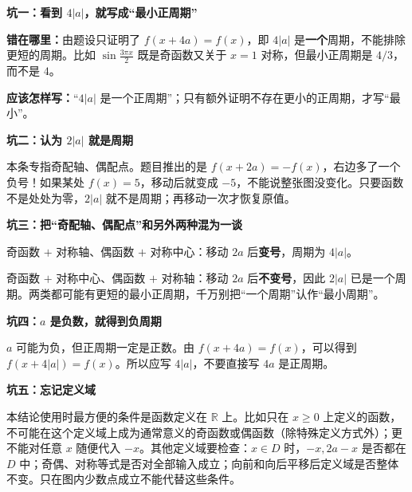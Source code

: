 \clearpage
\begin{trapbox}
\textbf{\textcolor{CTrap}{坑一：看到 $4|a|$，就写成“最小正周期”}}



\textbf{错在哪里：}由题设只证明了 $f(x+4a)=f(x)$，即 $4|a|$ 是\textbf{一个}周期，不能排除更短的周期。比如 $\sin\frac{3\pi x}{2}$ 既是奇函数又关于 $x=1$ 对称，但最小正周期是 $4/3$，而不是 $4$。

\textbf{应该怎样写：}“$4|a|$ 是一个正周期”；只有额外证明不存在更小的正周期，才写“最小”。

\medskip

\end{trapbox}
\clearpage
\begin{trapbox}
\textbf{\textcolor{CTrap}{坑二：认为 $2|a|$ 就是周期}}



本条专指奇配轴、偶配点。题目推出的是 $f(x+2a)=-f(x)$，右边多了一个负号！如果某处 $f(x)=5$，移动后就变成 $-5$，不能说整张图没变化。只要函数不是处处为零，$2|a|$ 就不是周期；再移动一次才恢复原值。

\medskip

\end{trapbox}
\clearpage
\begin{trapbox}
\textbf{\textcolor{CTrap}{坑三：把“奇配轴、偶配点”和另外两种混为一谈}}



奇函数 $+$ 对称轴、偶函数 $+$ 对称中心：移动 $2a$ 后\textbf{变号}，周期为 $4|a|$。

奇函数 $+$ 对称中心、偶函数 $+$ 对称轴：移动 $2a$ 后\textbf{不变号}，因此 $2|a|$ 已是一个周期。两类都可能有更短的最小正周期，千万别把“一个周期”认作“最小周期”。

\medskip

\end{trapbox}
\clearpage
\begin{trapbox}
\textbf{\textcolor{CTrap}{坑四：$a$ 是负数，就得到负周期}}



$a$ 可能为负，但正周期一定是正数。由 $f(x+4a)=f(x)$，可以得到 $f(x+4|a|)=f(x)$。所以应写 $4|a|$，不要直接写 $4a$ 是正周期。

\medskip

\end{trapbox}
\clearpage
\begin{trapbox}
\textbf{\textcolor{CTrap}{坑五：忘记定义域}}



本结论使用时最方便的条件是函数定义在 $\mathbb{R}$ 上。比如只在 $x\ge0$ 上定义的函数，不可能在这个定义域上成为通常意义的奇函数或偶函数（除特殊定义方式外）；更不能对任意 $x$ 随便代入 $-x$。其他定义域要检查：$x\in D$ 时，$-x,2a-x$ 是否都在 $D$ 中；奇偶、对称等式是否对全部输入成立；向前和向后平移后定义域是否整体不变。只在图内少数点成立不能代替这些条件。

\medskip

\end{trapbox}
